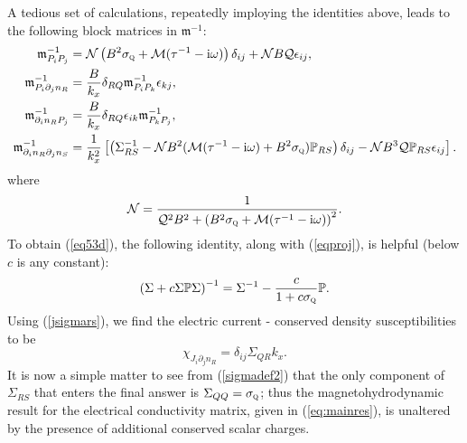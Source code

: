 \documentclass[10pt, oneside]{book}
\begin{document}
\begin{doublespace}
A tedious set of calculations, repeatedly imploying the identities above, leads to the following block matrices in $\mathfrak{m}^{-1}$: \begin{subequations}\label{eq58}\begin{align}
\mathfrak{m}_{P_i P_j}^{-1} &= \mathcal{N} \left( B^2\sigma_{\textsc{q}} + \mathcal{M}(\tau^{-1}-\mathrm{i}\omega)\right)\delta_{ij} + \mathcal{N}B\mathcal{Q}\epsilon_{ij} , \\
\mathfrak{m}_{P_i \partial_j n_R}^{-1} &= \frac{B}{k_x}\delta_{RQ} \mathfrak{m}_{P_i P_k}^{-1} \epsilon_{kj}, \\
\mathfrak{m}_{\partial_i n_R P_j}^{-1} &=  \frac{B}{k_x} \delta_{RQ} \epsilon_{ik} \mathfrak{m}_{P_k P_j}^{-1}, \\
\mathfrak{m}_{\partial_i n_R \partial_j n_S}^{-1} &= \frac{1}{k_x^2}\left[\left(\Sigma^{-1}_{RS} - \mathcal{N}B^2(\mathcal{M}(\tau^{-1}-\mathrm{i}\omega)+B^2\sigma_{\textsc{q}})\mathbb{P}_{RS}\right)\delta_{ij} - \mathcal{N}B^3 \mathcal{Q}\mathbb{P}_{RS}\epsilon_{ij}\right] . \label{eq53d}
\end{align}\end{subequations}
where \begin{equation}
\mathcal{N} = \frac{1}{\mathcal{Q}^2B^2 + \left(B^2\sigma_{\textsc{q}} + \mathcal{M}(\tau^{-1}-\mathrm{i}\omega)\right)^2}.
\end{equation}To obtain (\ref{eq53d}), the following identity, along with (\ref{eqproj}), is helpful (below $c$ is any constant):\begin{equation}
\left(\Sigma + c\Sigma \mathbb{P}\Sigma\right)^{-1} = \Sigma^{-1} - \frac{c}{1+c\sigma_{\textsc{q}}} \mathbb{P}.
\end{equation}
Using (\ref{jsigmars}), we find the electric current - conserved density susceptibilities to be \begin{equation}
\chi_{J_i \partial_j n_R} = \delta_{ij} \Sigma_{QR} k_x.
\end{equation}
It is now a simple matter to see from (\ref{sigmadef2}) that the only component of $\Sigma_{RS}$ that enters the final answer is $\Sigma_{QQ}=\sigma_{\textsc{q}}$;  thus the magnetohydrodynamic result for the electrical conductivity matrix, given in (\ref{eq:mainres}), is unaltered by the presence of additional conserved scalar charges.


\end{doublespace}
\end{document}
